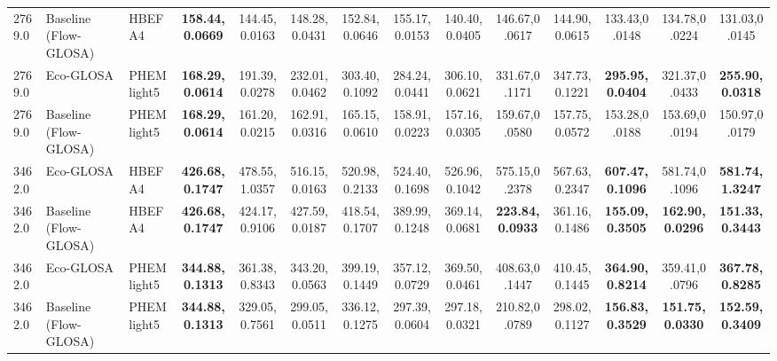 \begin{table}[htb]
{\begin{tabular}{l l l *{11}{c}}
      2769.0 & Baseline (Flow-GLOSA)   & HBEFA4       & \textbf{158.44,0.0669}   & 144.45,0.0163 & 148.28,0.0431 & 152.84,0.0646 & 155.17,0.0153 & 140.40,0.0405 & 146.67,0.0617 & 144.90,0.0615 & 133.43,0.0148 & 134.78,0.0224 & 131.03,0.0145 \\
      2769.0 & Eco-GLOSA               & PHEMlight5   & \textbf{168.29,0.0614}   & 191.39,0.0278 & 232.01,0.0462 & 303.40,0.1092 & 284.24,0.0441 & 306.10,0.0621 & 331.67,0.1171 & 347.73,0.1221 & \textbf{295.95,0.0404} & 321.37,0.0433 & \textbf{255.90,0.0318} \\
      2769.0 & Baseline (Flow-GLOSA)   & PHEMlight5   & \textbf{168.29,0.0614}   & 161.20,0.0215 & 162.91,0.0316 & 165.15,0.0610 & 158.91,0.0223 & 157.16,0.0305 & 159.67,0.0580 & 157.75,0.0572 & 153.28,0.0188 & 153.69,0.0194 & 150.97,0.0179 \\
      \midrule
      3462.0 & Eco-GLOSA               & HBEFA4       & \textbf{426.68,0.1747}   & 478.55,1.0357 & 516.15,0.0163 & 520.98,0.2133 & 524.40,0.1698 & 526.96,0.1042 & 575.15,0.2378 & 567.63,0.2347 & \textbf{607.47,0.1096} & 581.74,0.1096 & \textbf{581.74,1.3247} \\
      3462.0 & Baseline (Flow-GLOSA)   & HBEFA4       & \textbf{426.68,0.1747}   & 424.17,0.9106 & 427.59,0.0187 & 418.54,0.1707 & 389.99,0.1248 & 369.14,0.0681 & \textbf{223.84,0.0933} & 361.16,0.1486 & \textbf{155.09,0.3505} & \textbf{162.90,0.0296} & \textbf{151.33,0.3443} \\
      3462.0 & Eco-GLOSA               & PHEMlight5   & \textbf{344.88,0.1313}   & 361.38,0.8343 & 343.20,0.0563 & 399.19,0.1449 & 357.12,0.0729 & 369.50,0.0461 & 408.63,0.1447 & 410.45,0.1445 & \textbf{364.90,0.8214} & 359.41,0.0796 & \textbf{367.78,0.8285} \\
      3462.0 & Baseline (Flow-GLOSA)   & PHEMlight5   & \textbf{344.88,0.1313}   & 329.05,0.7561 & 299.05,0.0511 & 336.12,0.1275 & 297.39,0.0604 & 297.18,0.0321 & 210.82,0.0789 & 298.02,0.1127 & \textbf{156.83,0.3529} & \textbf{151.75,0.0330} & \textbf{152.59,0.3409} \\
      \bottomrule
    \end{tabular}%
  }
\end{table}
